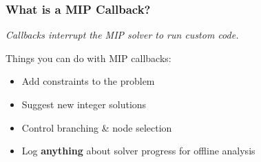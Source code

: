 \documentclass{beamer}
\begin{document}
\begin{frame}
  \frametitle{What is a MIP Callback?}

  \emph{Callbacks interrupt the MIP solver to run custom code.}\pause

  \vspace{2em}
  Things you can do with MIP callbacks:
  \begin{itemize}
  \item Add constraints to the problem\pause
  \item Suggest new integer solutions\pause
  \item Control branching \& node selection\pause
  \item Log {\bf anything} about solver progress for offline analysis
  \end{itemize}

\end{frame}
\end{document}
